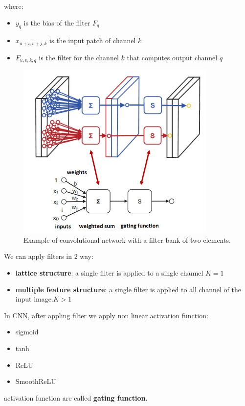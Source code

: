 where:
\begin{itemize}
    \item $y_q$ is the bias of the filter $F_q$
    \item $x_{u + i, v + j, k}$ is the input patch of channel $k$
    \item $F_{u, v, k, q}$ is the filter for the channel $k$ that computes output channel $q$ 
\end{itemize}

\begin{figure}[!ht]
    \centering
    \includegraphics[width=0.5\linewidth]{img/CNN/Conv2Filter.png}
    \caption{Example of convolutional network with a filter bank of two elements.}
    \label{fig:conv2filter}
\end{figure}

We can apply filters in 2 way:
\begin{itemize}
    \item \textbf{lattice structure}: a single filter is applied to a single channel  $K=1$
    \item \textbf{multiple feature structure}: a single filter is applied to all 
    channel of the input image.$K>1$
\end{itemize}

In CNN, after appling filter we apply non linear activation function:
\begin{itemize}
    \item sigmoid
    \item tanh
    \item ReLU
    \item SmoothReLU
\end{itemize}  
activation function are called \textbf{gating function}.

